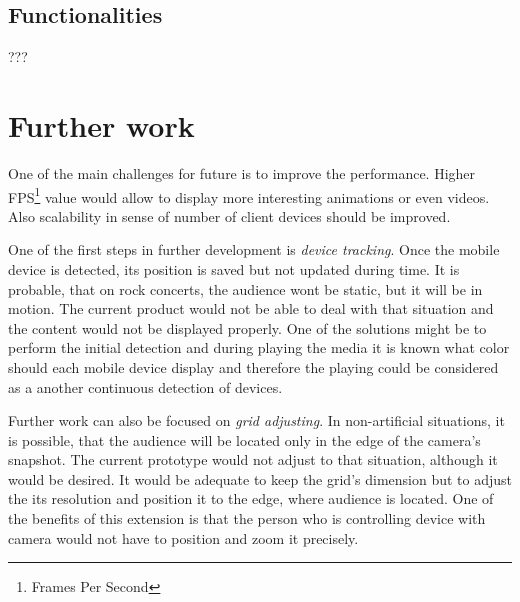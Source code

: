 \subsection{Functionalities}
???
\section{Further work}

One of the main challenges for future is to improve the performance.
Higher FPS\footnote{Frames Per Second} value would allow to display more interesting animations or even videos.
Also scalability in sense of number of client devices should be improved.

One of the first steps in further development is \emph{device tracking}.
Once the mobile device is detected, its position is saved but not updated during time.
It is probable, that on rock concerts, the audience wont be static, but it will be in motion.
The current product would not be able to deal with that situation and the content would not be displayed properly.
One of the solutions might be to perform the initial detection and during playing the media it is known what color should each mobile device display and therefore the playing could be considered as a another continuous detection of devices.

Further work can also be focused on \emph{grid adjusting}.
In non-artificial situations, it is possible, that the audience will be located only in the edge of the camera's snapshot.
The current prototype would not adjust to that situation, although it would be desired.
It would be adequate to keep the grid's dimension but to adjust the its resolution and position it to the edge, where audience is located.
One of the benefits of this extension is that the person who is controlling device with camera would not have to position and zoom it precisely.

